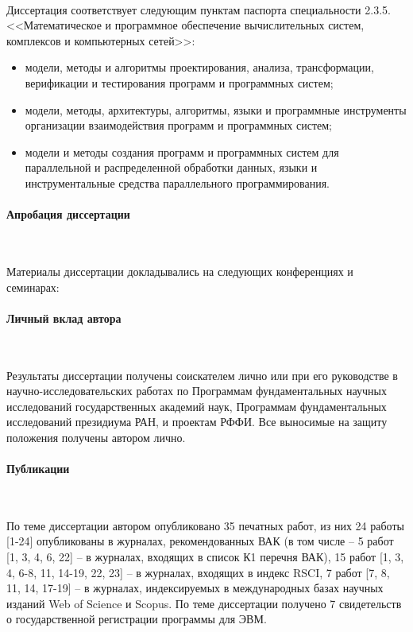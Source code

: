 \documentclass[a4paper,14pt]{extarticle}                     %
\theoremstyle{plain}                                         %
\begin{document}
\

Диссертация соответствует следующим пунктам паспорта специальности 2.3.5. <<Математическое и программное обеспечение вычислительных систем, комплексов и компьютерных сетей>>:
\begin{itemize}[noitemsep,topsep=0pt,parsep=0pt,partopsep=0pt]
\item модели, методы и алгоритмы проектирования, анализа, трансформации, верификации и тестирования программ и программных систем;
\item модели, методы, архитектуры, алгоритмы, языки и программные инструменты организации взаимодействия программ и программных систем;
\item модели и методы создания программ и программных систем для параллельной и распределенной обработки данных, языки и инструментальные средства параллельного программирования.
\end{itemize}

\paragraph{Апробация диссертации}

\

Материалы диссертации докладывались на следующих конференциях и семинарах:
\begin{itemize}[noitemsep,topsep=0pt,parsep=0pt,partopsep=0pt]

\end{itemize}

\paragraph{Личный вклад автора} 

\

Результаты диссертации получены соискателем лично или при его руководстве в научно-исследовательских работах по Программам фундаментальных научных исследований государственных академий наук, Программам фундаментальных исследований президиума РАН, и проектам РФФИ.
Все выносимые на защиту положения получены автором лично.

\paragraph{Публикации} 

\

По теме диссертации автором опубликовано 35 печатных работ, из них 24 работы [1-24] опубликованы в журналах, рекомендованных ВАК (в том числе -- 5 работ [1, 3, 4, 6, 22] -- в журналах, входящих в список К1 перечня ВАК), 15 работ [1, 3, 4, 6-8, 11, 14-19, 22, 23] -- в журналах, входящих в индекс RSCI, 7 работ [7, 8, 11, 14, 17-19] -- в журналах, индексируемых в международных базах научных изданий Web of Science и Scopus.
По теме диссертации получено 7 свидетельств о государственной регистрации программы для ЭВМ.
\end{document}
